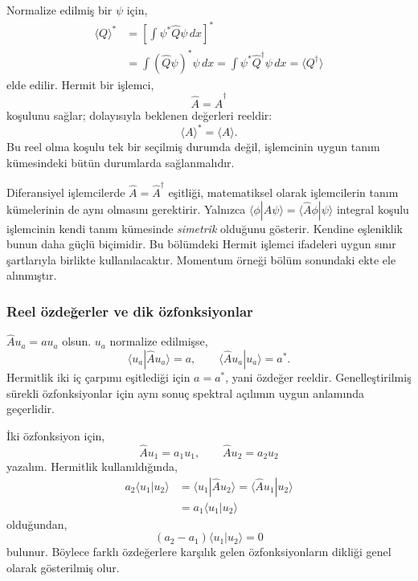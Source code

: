 Normalize edilmiş bir $\psi$ için,
\begin{align}
 \langle Q\rangle^*
 &=\left[\int\psi^*\hat Q\psi\,dx\right]^*\\
 &=\int(\hat Q\psi)^*\psi\,dx
 =\int\psi^*\hat Q^\dagger\psi\,dx
 =\langle Q^\dagger\rangle
 \label{eq:05_beklenen_eslenik}
\end{align}
elde edilir. Hermit bir işlemci,
\begin{equation}
 \boxed{\hat A=\hat A^\dagger}
 \label{eq:05_hermit}
\end{equation}
koşulunu sağlar; dolayısıyla beklenen değerleri reeldir:
\begin{equation}
 \langle A\rangle^*=\langle A\rangle.
\end{equation}
Bu reel olma koşulu tek bir seçilmiş durumda değil, işlemcinin
uygun tanım kümesindeki bütün durumlarda sağlanmalıdır.

\begin{tcolorbox}
Diferansiyel işlemcilerde $\hat A=\hat A^\dagger$ eşitliği,
matematiksel olarak işlemcilerin tanım kümelerinin de aynı olmasını
gerektirir. Yalnızca
$\langle\phi|\hat A\psi\rangle=\langle\hat A\phi|\psi\rangle$
integral koşulu işlemcinin kendi tanım kümesinde \emph{simetrik}
olduğunu gösterir. Kendine eşleniklik bunun daha güçlü biçimidir.
Bu bölümdeki Hermit işlemci ifadeleri uygun sınır şartlarıyla birlikte
kullanılacaktır. Momentum örneği bölüm sonundaki ekte ele alınmıştır.
\end{tcolorbox}

\subsubsection{Reel özdeğerler ve dik özfonksiyonlar}

$\hat A u_a=a u_a$ olsun. $u_a$ normalize edilmişse,
\begin{equation}
 \langle u_a|\hat A u_a\rangle=a,
 \qquad\langle\hat A u_a|u_a\rangle=a^*.
\end{equation}
Hermitlik iki iç çarpımı eşitlediği için $a=a^*$, yani özdeğer
reeldir. Genelleştirilmiş sürekli özfonksiyonlar için aynı sonuç
spektral açılımın uygun anlamında geçerlidir.

İki özfonksiyon için,
\begin{equation}
 \hat A u_1=a_1u_1,\qquad\hat A u_2=a_2u_2
\end{equation}
yazalım. Hermitlik kullanıldığında,
\begin{align}
 a_2\langle u_1|u_2\rangle
 &=\langle u_1|\hat A u_2\rangle
 =\langle\hat A u_1|u_2\rangle\\
 &=a_1\langle u_1|u_2\rangle
\end{align}
olduğundan,
\begin{equation}
 (a_2-a_1)\langle u_1|u_2\rangle=0
\end{equation}
bulunur. Böylece farklı özdeğerlere karşılık gelen özfonksiyonların
dikliği genel olarak gösterilmiş olur.

